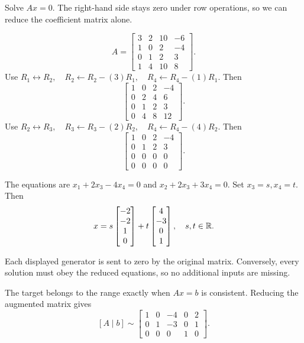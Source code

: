 
\goal Solve $Ax=0$. The right-hand side stays zero under row operations, so we can reduce the coefficient matrix alone.

\[ A=\begin{bmatrix}3 & 2 & 10 & -6\\1 & 0 & 2 & -4\\0 & 1 & 2 & 3\\1 & 4 & 10 & 8\end{bmatrix}.\]
Use $R_{1}\leftrightarrow R_{2},\quad R_{2}\leftarrow R_{2}-(3)R_{1},\quad R_{4}\leftarrow R_{4}-(1)R_{1}$. Then
\[ \begin{bmatrix}1 & 0 & 2 & -4\\0 & 2 & 4 & 6\\0 & 1 & 2 & 3\\0 & 4 & 8 & 12\end{bmatrix}.\]
Use $R_{2}\leftrightarrow R_{3},\quad R_{3}\leftarrow R_{3}-(2)R_{2},\quad R_{4}\leftarrow R_{4}-(4)R_{2}$. Then
\[ \begin{bmatrix}1 & 0 & 2 & -4\\0 & 1 & 2 & 3\\0 & 0 & 0 & 0\\0 & 0 & 0 & 0\end{bmatrix}.\]

The equations are $x_1+2x_3-4x_4=0$ and $x_2+2x_3+3x_4=0$. Set $x_3=s,x_4=t$. Then
\[ x=s\begin{bmatrix}-2\\-2\\1\\0\end{bmatrix}+t\begin{bmatrix}4\\-3\\0\\1\end{bmatrix},\quad s,t\in\mathbb{R}.\]

Each displayed generator is sent to zero by the original matrix. Conversely, every solution must obey the reduced equations, so no additional inputs are missing.



The target belongs to the range exactly when $Ax=b$ is consistent. Reducing the augmented matrix gives
\[ [A\mid b]\sim \begin{bmatrix}1 & 0 & -4 & 0 & 2\\0 & 1 & -3 & 0 & 1\\0 & 0 & 0 & 1 & 0\end{bmatrix}.\]

